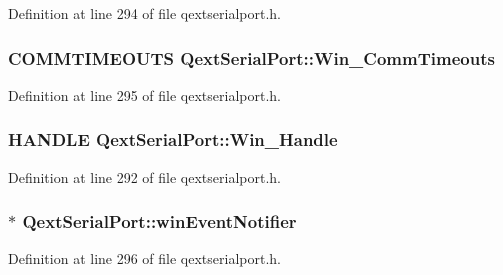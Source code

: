 Definition at line 294 of file qextserialport.\-h.

\hypertarget{class_qext_serial_port_ac4bc741baf6ceae86ab69e358e29c823}{
\subsubsection[{Win\-\_\-\-Comm\-Timeouts}]{\setlength{\rightskip}{0pt plus 5cm}C\-O\-M\-M\-T\-I\-M\-E\-O\-U\-T\-S Qext\-Serial\-Port\-::\-Win\-\_\-\-Comm\-Timeouts\hspace{0.3cm}{\ttfamily [protected]}}}\label{class_qext_serial_port_ac4bc741baf6ceae86ab69e358e29c823}


Definition at line 295 of file qextserialport.\-h.

\hypertarget{class_qext_serial_port_a82bc5cd954e7becbb48c595724275f82}{
\subsubsection[{Win\-\_\-\-Handle}]{\setlength{\rightskip}{0pt plus 5cm}H\-A\-N\-D\-L\-E Qext\-Serial\-Port\-::\-Win\-\_\-\-Handle\hspace{0.3cm}{\ttfamily [protected]}}}\label{class_qext_serial_port_a82bc5cd954e7becbb48c595724275f82}


Definition at line 292 of file qextserialport.\-h.

\hypertarget{class_qext_serial_port_aad5fe6450d0fab180df28d47e9eb6463}{
\subsubsection[{win\-Event\-Notifier}]{$\ast$ Qext\-Serial\-Port\-::win\-Event\-Notifier\hspace{0.3cm}{\ttfamily [protected]}}}\label{class_qext_serial_port_aad5fe6450d0fab180df28d47e9eb6463}


Definition at line 296 of file qextserialport.\-h.



